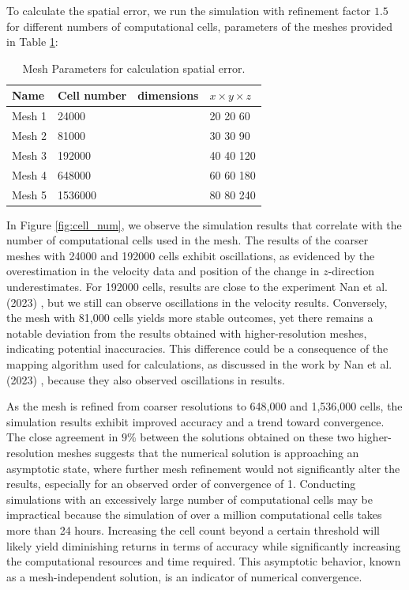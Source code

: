 To calculate the spatial error, we run the simulation with refinement factor $1.5$ for different numbers of computational cells, parameters of the meshes provided in Table \ref{table1-chap4}:

\begin{table}[H]
    \centering
    \caption{Mesh Parameters for calculation spatial error. } \label{table1-chap4}
    \begin{tabular}{llll}
        \toprule
        \hline
        Name     & Cell number & dimensions&$x\times y \times z $\\
        \hline
        \midrule
        Mesh 1   & 24000 && 20 20 60\\
        Mesh 2 & 81000 & &30 30 90\\
        Mesh 3 & 192000 &&40 40 120 \\
        Mesh 4 & 648000 & &60 60 180 \\
        Mesh 5 & 1536000 & &80 80 240\\
        \hline
        \bottomrule
     \end{tabular}
\end{table}

In Figure \ref{fig:cell_num}, we observe the simulation results that correlate with the number of computational cells used in the mesh. The results of the coarser meshes with 24000 and 192000 cells exhibit oscillations, as evidenced by the overestimation in the velocity data and position of the change in $z$-direction underestimates. For 192000 cells, results are close to the experiment Nan et al. (2023) \cite{nan2023high}, but we still can observe oscillations in the velocity results. Conversely, the mesh with 81,000 cells yields more stable outcomes, yet there remains a notable deviation from the results obtained with higher-resolution meshes, indicating potential inaccuracies. This difference could be a consequence of the mapping algorithm used for calculations, as discussed in the work by Nan et al. (2023) \cite{nan2023high}, because they also observed oscillations in results.

As the mesh is refined from coarser resolutions to 648,000 and 1,536,000 cells, the simulation results exhibit improved accuracy and a trend toward convergence. The close agreement in $9$\% between the solutions obtained on these two higher-resolution meshes suggests that the numerical solution is approaching an asymptotic state, where further mesh refinement would not significantly alter the results, especially for an observed order of convergence of 1. Conducting simulations with an excessively large number of computational cells may be impractical because the simulation of over a million computational cells takes more than 24 hours. Increasing the cell count beyond a certain threshold will likely yield diminishing returns in terms of accuracy while significantly increasing the computational resources and time required. This asymptotic behavior, known as a mesh-independent solution, is an indicator of numerical convergence.

